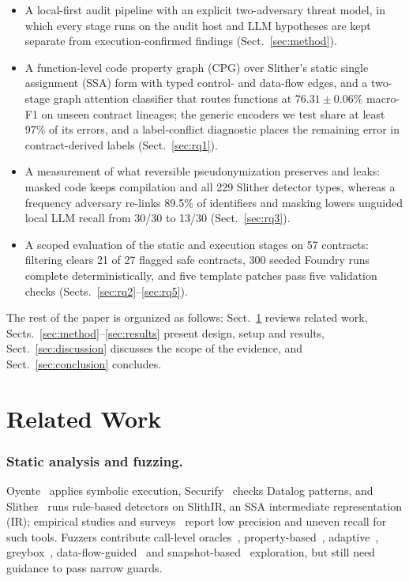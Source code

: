 \documentclass[runningheads]{llncs}
\begin{document}
\begin{itemize}
\item A local-first audit pipeline with an explicit two-adversary threat model, in which every stage runs on the audit host and LLM hypotheses are kept separate from execution-confirmed findings (Sect.~\ref{sec:method}).
\item A function-level code property graph (CPG) over Slither's static single assignment (SSA) form with typed control- and data-flow edges, and a two-stage graph attention classifier that routes functions at $76.31\pm0.06\%$ macro-F1 on unseen contract lineages; the generic encoders we test share at least 97\% of its errors, and a label-conflict diagnostic places the remaining error in contract-derived labels (Sect.~\ref{sec:rq1}).
\item A measurement of what reversible pseudonymization preserves and leaks: masked code keeps compilation and all 229 Slither detector types, whereas a frequency adversary re-links 89.5\% of identifiers and masking lowers unguided local LLM recall from 30/30 to 13/30 (Sect.~\ref{sec:rq3}).
\item A scoped evaluation of the static and execution stages on 57 contracts: filtering clears 21 of 27 flagged safe contracts, 300 seeded Foundry runs complete deterministically, and five template patches pass five validation checks (Sects.~\ref{sec:rq2}--\ref{sec:rq5}).
\end{itemize}
The rest of the paper is organized as follows: Sect.~\ref{sec:related} reviews related work, Sects.~\ref{sec:method}--\ref{sec:results} present design, setup and results, Sect.~\ref{sec:discussion} discusses the scope of the evidence, and Sect.~\ref{sec:conclusion} concludes.

\section{Related Work}
\label{sec:related}

\subsubsection{Static analysis and fuzzing.}
Oyente~\cite{luu2016making} applies symbolic execution, Securify~\cite{tsankov2018securify} checks Datalog patterns, and Slither~\cite{feist2019slither} runs rule-based detectors on SlithIR, an SSA intermediate representation (IR); empirical studies and surveys~\cite{durieux2020empirical,ghaleb2020effective,zhu2024survey} report low precision and uneven recall for such tools. Fuzzers contribute call-level oracles~\cite{jiang2018contractfuzzer}, property-based~\cite{grieco2020echidna}, adaptive~\cite{nguyen2020sfuzz}, greybox~\cite{wustholz2020harvey}, data-flow-guided~\cite{choi2021smartian} and snapshot-based~\cite{shou2023ityfuzz} exploration, but still need guidance to pass narrow guards.
\end{document}
